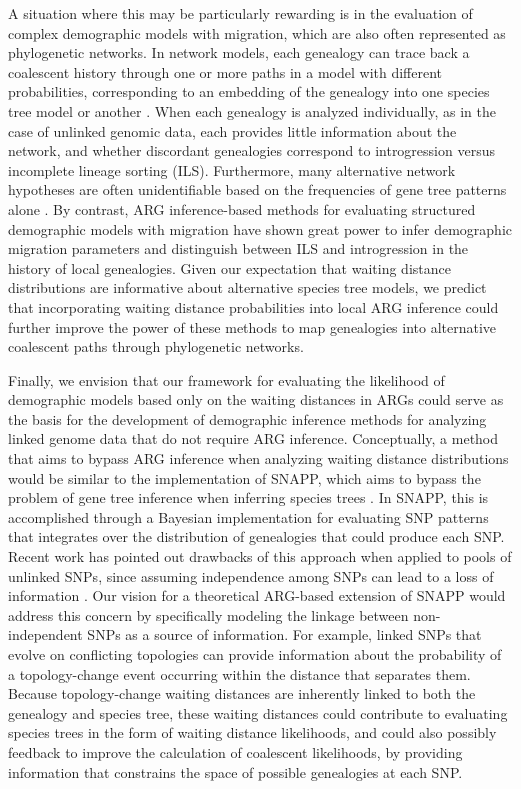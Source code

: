 \documentclass[11pt]{article}
\begin{document}
A situation where this may be particularly rewarding is in 
the evaluation of complex demographic models with migration, 
which are also often represented as phylogenetic networks.
% 
In network models, each genealogy can trace back a coalescent 
history through one or more paths in a model with different 
probabilities, corresponding to an embedding of the genealogy 
into one species tree model or another
\citep{wen_bayesian_2016, degnan2018modeling}. %
% 
When each genealogy is analyzed individually, as in the case of 
unlinked genomic data, each provides little information about the
network, and whether discordant genealogies correspond to 
introgression versus incomplete lineage sorting (ILS).
% 
Furthermore, many alternative network hypotheses are often 
unidentifiable based on the frequencies of gene tree patterns
alone \citep{solis-lemus_inferring_2016}.
% 
By contrast, ARG inference-based methods for evaluating 
structured demographic models with migration 
\citep{hubisz2020inference, guo_recombination-aware_2022}
have shown great power to infer demographic migration parameters
and distinguish between ILS and introgression in the history of
local genealogies.
% 
Given our expectation that waiting distance distributions are 
informative about alternative species tree models, we predict
that incorporating waiting distance probabilities into local ARG 
inference could further improve the power of these methods to map
genealogies into alternative coalescent paths through phylogenetic
networks.


Finally, we envision that our framework for evaluating the 
likelihood of demographic models based only on the waiting distances
in ARGs could serve as the basis for the development of demographic
inference methods for analyzing linked genome data that do 
not require ARG inference.
% 
Conceptually, a method that aims to bypass ARG inference when 
analyzing waiting distance distributions would be similar to 
the implementation of SNAPP, which aims to bypass the problem of 
gene tree inference when inferring species trees 
\citep{bryant2012inferring}.
In SNAPP, this is accomplished through a Bayesian implementation
for evaluating SNP patterns that integrates over the distribution
of genealogies that could produce each SNP.
% 
Recent work has pointed out drawbacks of this approach when applied to
pools of unlinked SNPs, since assuming independence among SNPs can 
lead to a loss of information \citep{zhu2021complexity}. 
% 
Our vision for a theoretical ARG-based extension of SNAPP would 
address this concern by specifically modeling the linkage between 
non-independent SNPs as a source of information.
% 
For example, linked SNPs that evolve on conflicting topologies can 
provide information about the probability of a topology-change event 
occurring within the distance that separates them. 
% 
Because topology-change waiting distances are inherently linked to both
the genealogy and species tree, these waiting distances could contribute
to evaluating species trees in the form of waiting distance likelihoods,
and could also possibly feedback to improve the calculation of coalescent
likelihoods, by providing information that constrains the space of 
possible genealogies at each SNP. 
\end{document}
